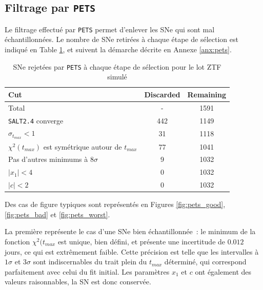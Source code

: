 \documentclass{book}
\def\pets{\texttt{PETS}\xspace}
\def\saltd{\texttt{SALT2.4}\xspace}
\begin{document}
\subsection{Filtrage par \pets}

Le filtrage effectué par \pets permet d'enlever les SNe qui sont mal échantillonnées. Le nombre de SNe retirées à chaque étape de sélection est indiqué en Table \ref{tab:pets}, et suivent la démarche décrite en Annexe \ref{anx:pets}.

\begin{table}
    \centering
    \begin{tabular}{p{5cm}|c|c}
         Cut & Discarded & Remaining\\
         \hline
         Total & - & 1591\\
         \saltd converge & 442 & 1149\\
         $\sigma_{t_{max}}<1$ & 31 & 1118\\
         $\chi^2(t_{max})$ est symétrique autour de $t_{max}$ & 77 & 1041\\
         Pas d'autres minimums à $8\sigma$ & 9 & 1032\\
	$|x_1|<4$ & 0 & 1032\\
	$|c|<2$ & 0  & 1032
    \end{tabular}
    \caption{SNe rejetées par \pets à chaque étape de sélection pour le lot ZTF simulé}
    \label{tab:pets}
\end{table}

 Des cas de figure typiques sont représentés en Figures \ref{fig:pets_good}, \ref{fig:pets_bad} et \ref{fig:pets_worst}.
 
La première représente le cas d'une SNe bien échantillonnée~: le minimum de la fonction $\chi^2(t_{max}$ est unique, bien défini, et présente une incertitude de $0.012$ jours, ce qui est extrêmement faible. Cette précision est telle que les intervalles à $1\sigma$ et $3\sigma$ sont indiscernables du trait plein du $t_{max}$ déterminé, qui correspond parfaitement avec celui du fit initial. Les paramètres $x_1$ et $c$ ont également des valeurs raisonnables, la SN est donc conservée.
\end{document}
